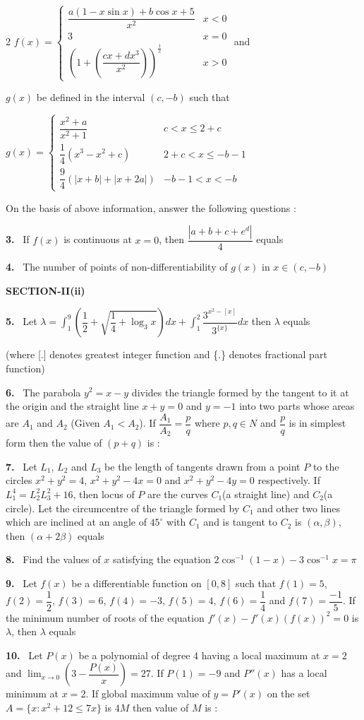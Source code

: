 \documentclass[10pt]{extarticle}
\newcommand{\sect}[1]{\par\smallskip\noindent\textbf{#1}\par}
\newcommand{\qn}[1]{\par\smallskip\noindent\textbf{#1.}~}
\begin{document}
\begin{multicols}{2}
$f(x)=\begin{cases}\dfrac{a(1-x\sin x)+b\cos x+5}{x^2} & x<0\\[2mm] 3 & x=0\\[1mm] \left(1+\left(\dfrac{cx+dx^3}{x^2}\right)\right)^{\frac1x} & x>0\end{cases}$ and\par
$g(x)$ be defined in the interval $(c,-b)$ such that\par
$g(x)=\begin{cases}\dfrac{x^2+a}{x^2+1} & c<x\leqslant2+c\\[2mm] \dfrac14\left(x^3-x^2+c\right) & 2+c<x\leqslant-b-1\\[2mm] \dfrac94\left(|x+b|+|x+2a|\right) & -b-1<x<-b\end{cases}$\par
On the basis of above information, answer the following questions :
\qn{3} If $f(x)$ is continuous at $x=0$, then $\dfrac{\left|a+b+c+e^d\right|}4$ equals
\qn{4} The number of points of non-differentiability of $g(x)$ in $x\in(c,-b)$
\sect{SECTION-II(ii)}
\qn{5} Let $\lambda=\displaystyle\int_1^9\left(\dfrac12+\sqrt{\dfrac14+\log_3x}\right)dx+\int_1^2\dfrac{3^{x^2-[x]}}{3^{\{x\}}}dx$ then $\lambda$ equals\par
(where [.] denotes greatest integer function and \{.\} denotes fractional part function)
\qn{6} The parabola $y^2=x-y$ divides the triangle formed by the tangent to it at the origin and the straight line $x+y=0$ and $y=-1$ into two parts whose areas are $A_1$ and $A_2$ (Given $A_1<A_2$). If $\dfrac{A_1}{A_2}=\dfrac pq$ where $p,q\in N$ and $\dfrac pq$ is in simplest form then the value of $(p+q)$ is :
\qn{7} Let $L_1$, $L_2$ and $L_3$ be the length of tangents drawn from a point $P$ to the circles $x^2+y^2=4$, $x^2+y^2-4x=0$ and $x^2+y^2-4y=0$ respectively. If $L_1^4=L_2^2L_3^2+16$, then locus of $P$ are the curves $C_1$(a straight line) and $C_2$(a circle). Let the circumcentre of the triangle formed by $C_1$ and other two lines which are inclined at an angle of $45^\circ$ with $C_1$ and is tangent to $C_2$ is $(\alpha,\beta)$, then $(\alpha+2\beta)$ equals
\qn{8} Find the values of $x$ satisfying the equation $2\cos^{-1}(1-x)-3\cos^{-1}x=\pi$
\qn{9} Let $f(x)$ be a differentiable function on $[0,8]$ such that $f(1)=5$, $f(2)=\dfrac12$, $f(3)=6$, $f(4)=-3$, $f(5)=4$, $f(6)=\dfrac14$ and $f(7)=\dfrac{-1}5$. If the minimum number of roots of the equation $f'(x)-f'(x)(f(x))^2=0$ is $\lambda$, then $\lambda$ equals
\qn{10} Let $P(x)$ be a polynomial of degree 4 having a local maximum at $x=2$ and $\displaystyle\lim_{x\to0}\left(3-\dfrac{P(x)}x\right)=27$. If $P(1)=-9$ and $P''(x)$ has a local minimum at $x=2$. If global maximum value of $y=P'(x)$ on the set $A=\{x:x^2+12\le7x\}$ is $4M$ then value of $M$ is :
\end{multicols}
\end{document}
